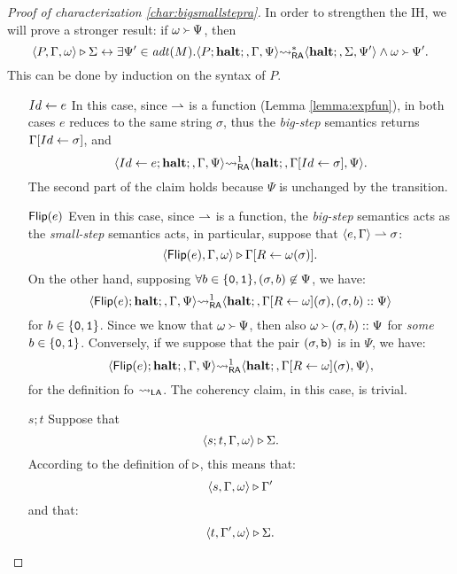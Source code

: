 \begin{proof}[Proof of characterization \ref{char:bigsmallstepra}]
  In order to strengthen the IH, we will prove a stronger result:
  if $\omega \Yright \Psi$, then
  $$
  \langle P, \Gamma, \omega\rangle \triangleright \Sigma \leftrightarrow  \exists \Psi' \in \mathit{adt}(M).\langle P;\mathbf{halt};, \Gamma, \Psi\rangle {\leadsto_{\mathsf{RA}}^{*}}  \langle \mathbf{halt};, \Sigma, \Psi'\rangle \land \omega \Yright \Psi'.
  $$
  This can be done by induction on the syntax of $P$.
  \begin{itemize}
    \item[$Id \leftarrow e$] In this case, since $\rightharpoonup$ is a function (Lemma \ref{lemma:expfun}),
    in both cases $e$ reduces to the same string $\sigma$, thus the \emph{big-step} semantics
    returns $\Gamma [Id \leftarrow \sigma]$, and
    $$
    \langle Id \leftarrow e; \mathbf{halt};, \Gamma, \Psi\rangle {\leadsto_{\mathsf{RA}}^{1}}  \langle \mathbf{halt};, \Gamma [Id \leftarrow \sigma],\Psi\rangle.
    $$
    The second part of the claim holds because $\Psi$ is unchanged by the transition.
    \item[$\mathsf{Flip(}e\mathsf{)}$] Even in this case, since $\rightharpoonup$ is a function,
    the \emph{big-step} semantics acts as the \emph{small-step} semantics acts,
    in particular, suppose that $\langle e, \Gamma\rangle \rightharpoonup \sigma$:
    $$
      \langle \mathsf{Flip(}e\mathsf{)}, \Gamma, \omega\rangle \triangleright \Gamma[R \leftarrow \omega(\sigma)].
    $$
    On the other hand, supposing $\forall b \in \{\mathtt{0}, \mathtt{1}\}, (\sigma, b)\not \in \Psi$, we have:
    $$
    \langle \mathsf{Flip(}e\mathsf{)}; \mathbf{halt};, \Gamma, \Psi\rangle {\leadsto_{\mathsf{RA}}^{1}}  \langle \mathbf{halt};, \Gamma [R \leftarrow \omega](\sigma),(\sigma, b)::\Psi\rangle
    $$
    for $b \in \{\mathtt{0}, \mathtt{1}\}$.
    Since we know that $\omega \Yright \Psi$, then also $\omega \Yright (\sigma, b)::\Psi$
    for \emph{some} $b \in \{\mathtt{0}, \mathtt{1}\}$.
    Conversely, if we suppose that the pair $(\sigma, \mathtt{b})$ is in $\Psi$, we have:
    $$
    \langle \mathsf{Flip(}e\mathsf{)}; \mathbf{halt};, \Gamma, \Psi\rangle {\leadsto_{\mathsf{RA}}^{1}}  \langle \mathbf{halt};, \Gamma [R \leftarrow \omega](\sigma),\Psi\rangle,
    $$
    for the definition fo ${\leadsto_{\mathsf{LA}}}$. The coherency claim, in this case,  is trivial.
    \item[$s;t$] Suppose that
    $$
    \langle s;t, \Gamma, \omega\rangle \triangleright \Sigma.
    $$
    According to the definition of $\triangleright$, this means that:
    $$
    \langle s, \Gamma, \omega\rangle \triangleright \Gamma'
    $$
    and that:
    $$
    \langle t, \Gamma', \omega\rangle \triangleright \Sigma.
    $$

\end{itemize}
\end{proof}
